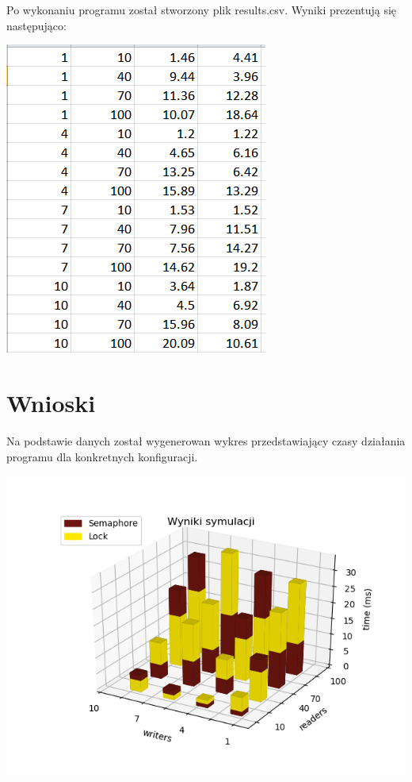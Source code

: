 \documentclass[12pt]{article}
\begin{document}
\noindent
Po wykonaniu programu został stworzony plik results.csv. Wyniki prezentują się następująco:

\begin{center}
\centering
    \includegraphics{results.png}
\end{center}


\section{Wnioski}
Na podstawie danych został wygenerowan wykres przedstawiający czasy działania programu dla konkretnych konfiguracji. 

\begin{center}
\centering
    \includegraphics{chart_readers_writers.png}
\end{center}
\end{document}
